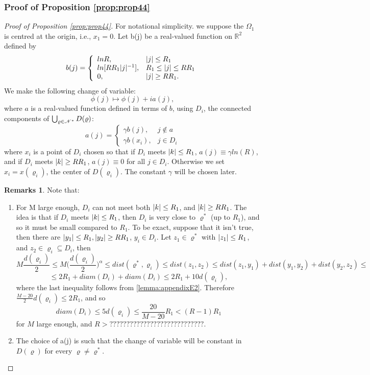 \documentclass[11pt,reqno]{article}
\DeclarePairedDelimiter\abs{\lvert}{\rvert}%
\theoremstyle{definition}
\newtheorem*{remarks}{Remarks}
\newcommand{\twopartdef}[4]
{
	\left\{
		\begin{array}{ll}
			#1 & #2 \\
			#3 & #4
		\end{array}
	\right.
}
\newcommand{\threepartdef}[6]
{
	\left\{
		\begin{array}{lll}
			#1 & #2 \\
			#3 & #4 \\
			#5 & #6
		\end{array}
	\right.
}
\numberwithin{equation}{section}
\begin{document}
\subsubsection{Proof of Proposition \eqref{prop:prop44}}
\begin{proof}[Proof of Proposition \eqref{prop:prop44}]
For notational simplicity. we suppose the $\Omega_1$ is centred at the origin, i.e., $x_1=0$. Let b(j) be a real-valued function on $\mathbb{R}^2$ defined by
$$
b(j) = 
\threepartdef{lnR,} {\abs{j} \leq R_1}
{ln[RR_1\abs{j}^{-1}],}{R_1 \leq \abs{j} \leq RR_1}
{0,}{\abs{j} \geq RR_1.}
$$
We make the following change of variable:
$$
\phi(j) \longmapsto \phi(j) + ia(j),
$$
where $a$ is a real-valued function defined in terms of $b$, using $D_i$, the connected components of $\bigcup_{\varrho \in \mathscr{N}^*}D(\varrho)$:
\begin{equation} \label{label:eq437}
a(j) = 
\twopartdef{\gamma b(j),} {j \notin a}
{\gamma b(x_i),}{j \in D_i}
\end{equation}
where $x_i$ is a point of $D_i$ chosen so that if $D_i$ meets $\abs{k} \leq R_1$, $a(j)\equiv \gamma ln(R)$, and if $D_i$ meets $\abs{k} \geq RR_1$, $a(j)\equiv 0$ for all $j \in D_i$. Otherwise we set $x_i=x(\varrho_i)$, the center of $D(\varrho_i)$. The constant $\gamma$ will be chosen later.

\begin{remarks}
Note that:
\begin{enumerate}
\item For M large enough, $D_i$ can not meet both $\abs{k} \leq R_1$, and $\abs{k} \geq RR_1$. The idea is that if $D_i$ meets $\abs{k} \leq R_1$, then $D_i$ is very close to $\varrho^*$ (up to $R_1$), and so it must be small compared to $R_1$. 
To be exact, suppose that it isn't true, then there are $\abs{y_1} \leq R_1, \abs{y_2} \geq RR_1$, $y_i \in D_i$. Let $z_1 \in \varrho^*$ with $\abs{z_1} \leq R_1$, and $z_2 \in \varrho_i \subseteq D_i$, then
$$
M\frac{d(\varrho_i)}{2} \leq M\Big( \frac{d(\varrho_i)}{2} \Big)^\alpha \leq dist(\varrho^*, \varrho_i) \leq dist(z_1, z_2) \leq dist(z_1, y_1) + dist(y_1, y_2) + dist(y_2, z_2) \leq 
$$
$$
\leq 2R_1 + diam(D_i) + diam(D_i) \leq 2R_1 + 10 d(\varrho_i),
$$
where the last inequality follows from \eqref{lemma:appendixE2}. Therefore $\frac{M-20}{2}d(\varrho_i) \leq 2R_1$, and so
$$
diam(D_i) \leq 5d(\varrho_i) \leq \frac{20}{M-20} R_1 < (R-1)R_1
$$
for $M$ large enough, and $R>????????????????????????????$.
\item The choice of a(j) is such that the change of variable will be constant in $D(\varrho)$ for every $\varrho \neq \varrho^*$.\\
\end{enumerate}
\end{remarks}


\end{proof}
\end{document}
